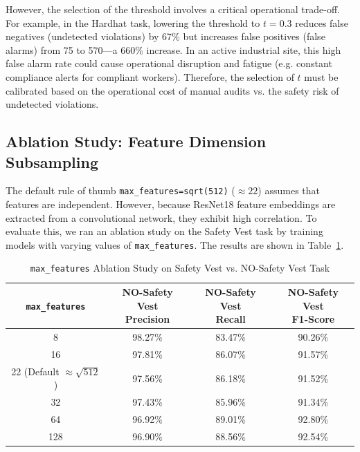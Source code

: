 \documentclass[11pt,a4paper]{article}
\begin{document}
However, the selection of the threshold involves a critical operational trade-off. For example, in the Hardhat task, lowering the threshold to $t=0.3$ reduces false negatives (undetected violations) by 67\% but increases false positives (false alarms) from 75 to 570—a 660\% increase. In an active industrial site, this high false alarm rate could cause operational disruption and fatigue (e.g. constant compliance alerts for compliant workers). Therefore, the selection of $t$ must be calibrated based on the operational cost of manual audits vs. the safety risk of undetected violations.

\subsection{Ablation Study: Feature Dimension Subsampling}
\label{sec:ablation_features}
The default rule of thumb \texttt{max\_features=sqrt(512)} ($\approx 22$) assumes that features are independent. However, because ResNet18 feature embeddings are extracted from a convolutional network, they exhibit high correlation. To evaluate this, we ran an ablation study on the Safety Vest task by training models with varying values of \texttt{max\_features}. The results are shown in Table~\ref{tab:max_features_ablation}.

\begin{table}[H]
\centering
\caption{\texttt{max\_features} Ablation Study on Safety Vest vs. NO-Safety Vest Task}
\label{tab:max_features_ablation}
\begin{tabular}{@{}cccc@{}}
\toprule
\textbf{\texttt{max\_features}} & \shortstack[c]{\textbf{NO-Safety Vest} \\ \textbf{Precision}} & \shortstack[c]{\textbf{NO-Safety Vest} \\ \textbf{Recall}} & \shortstack[c]{\textbf{NO-Safety Vest} \\ \textbf{F1-Score}} \\ \midrule
8                               & 98.27\%                           & 83.47\%                        & 90.26\%                          \\
16                              & 97.81\%                           & 86.07\%                        & 91.57\%                          \\
22 (Default $\approx\!\sqrt{512}$)& 97.56\%                           & 86.18\%                        & 91.52\%                          \\
32                              & 97.43\%                           & 85.96\%                        & 91.34\%                          \\
64                              & 96.92\%                           & 89.01\%                        & 92.80\%                          \\
128                             & 96.90\%                           & 88.56\%                        & 92.54\%                          \\ \bottomrule
\end{tabular}
\end{table}
\end{document}
